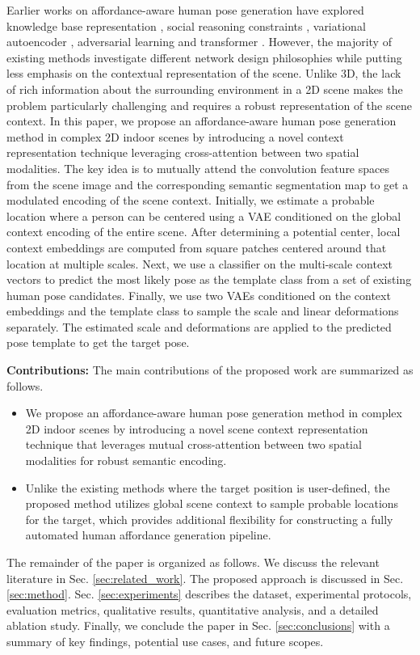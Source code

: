 Earlier works on affordance-aware human pose generation have explored knowledge base representation \cite{zhu2014reasoning}, social reasoning constraints \cite{chuang2018learning}, variational autoencoder \cite{wang2017binge}, adversarial learning \cite{wang2021scene, zhang2022inpaint} and transformer \cite{yao2023scene}. However, the majority of existing methods investigate different network design philosophies while putting less emphasis on the contextual representation of the scene. Unlike 3D, the lack of rich information about the surrounding environment in a 2D scene makes the problem particularly challenging and requires a robust representation of the scene context.
In this paper, we propose an affordance-aware human pose generation method in complex 2D indoor scenes by introducing a novel context representation technique leveraging cross-attention between two spatial modalities. The key idea is to mutually attend the convolution feature spaces from the scene image and the corresponding semantic segmentation map to get a modulated encoding of the scene context. Initially, we estimate a probable location where a person can be centered using a VAE conditioned on the global context encoding of the entire scene. After determining a potential center, local context embeddings are computed from square patches centered around that location at multiple scales. Next, we use a classifier on the multi-scale context vectors to predict the most likely pose as the template class from a set of existing human pose candidates. Finally, we use two VAEs conditioned on the context embeddings and the template class to sample the scale and linear deformations separately. The estimated scale and deformations are applied to the predicted pose template to get the target pose.

\vspace{1.20em}

\noindent
\textbf{Contributions:} The main contributions of the proposed work are summarized as follows.

\begin{itemize}
  \item We propose an affordance-aware human pose generation method in complex 2D indoor scenes by introducing a novel scene context representation technique that leverages mutual cross-attention between two spatial modalities for robust semantic encoding.
  \item Unlike the existing methods where the target position is user-defined, the proposed method utilizes global scene context to sample probable locations for the target, which provides additional flexibility for constructing a fully automated human affordance generation pipeline.
\end{itemize}

The remainder of the paper is organized as follows. We discuss the relevant literature in Sec. \ref{sec:related_work}. The proposed approach is discussed in Sec. \ref{sec:method}. Sec. \ref{sec:experiments} describes the dataset, experimental protocols, evaluation metrics, qualitative results, quantitative analysis, and a detailed ablation study. Finally, we conclude the paper in Sec. \ref{sec:conclusions} with a summary of key findings, potential use cases, and future scopes.

